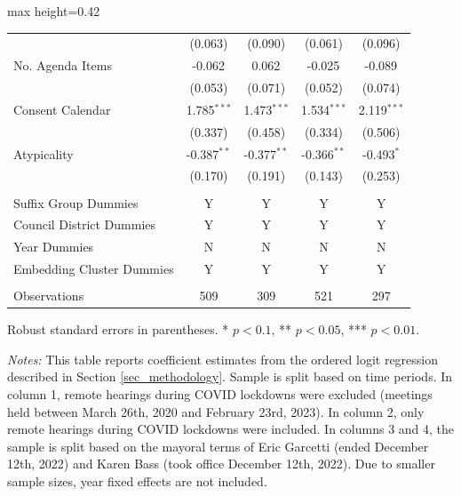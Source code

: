 \begin{table}[H]
\begin{adjustbox}{max height=0.42\textheight}
\begin{threeparttable}
\begin{tabular}{lcccc}
 & (0.063) & (0.090) & (0.061) & (0.096) \\ [1.8ex]
No. Agenda Items  & -0.062$^{}$ & 0.062$^{}$ & -0.025$^{}$ & -0.089$^{}$ \\
 & (0.053) & (0.071) & (0.052) & (0.074) \\ [1.8ex]
Consent Calendar  & 1.785$^{***}$ & 1.473$^{***}$ & 1.534$^{***}$ & 2.119$^{***}$ \\
 & (0.337) & (0.458) & (0.334) & (0.506) \\ [1.8ex]
Atypicality  & -0.387$^{**}$ & -0.377$^{**}$ & -0.366$^{**}$ & -0.493$^{*}$ \\
 & (0.170) & (0.191) & (0.143) & (0.253) \\ [1.8ex]

 & & & & \\ 
Suffix Group Dummies  & Y  & Y  & Y  & Y  \\ 
Council District Dummies  & Y  & Y  & Y  & Y  \\ 
Year Dummies  & N  & N  & N  & N  \\ 
Embedding Cluster Dummies  & Y  & Y  & Y  & Y  \\ 

 & & & & \\ 
Observations  & 509 & 309 & 521 & 297 \\ [1.8ex]
\bottomrule
\end{tabular}
\begin{tablenotes}[flushleft]
\footnotesize
\item Robust standard errors in parentheses. * $p<0.1$, ** $p<0.05$, *** $p<0.01$.
\item \textit{Notes:} This table reports coefficient estimates from the ordered logit regression described in Section \ref{sec_methodology}. Sample is split based on time periods. In column 1, remote hearings during COVID lockdowns were excluded (meetings held between March 26th, 2020 and February 23rd, 2023). In column 2, only remote hearings during COVID lockdowns were included. In columns 3 and 4, the sample is split based on the mayoral terms of Eric Garcetti (ended December 12th, 2022) and Karen Bass (took office December 12th, 2022). Due to smaller sample sizes, year fixed effects are not included.
\end{tablenotes}
\end{threeparttable}
\end{adjustbox}
\end{table}
